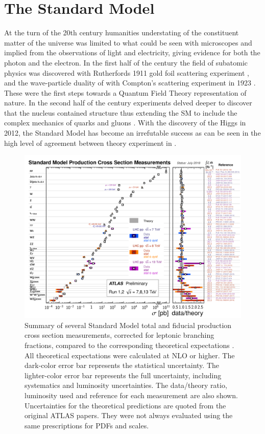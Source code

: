 \section{The Standard Model} \label{sec:theory:standardmodel}

At the turn of the 20th century humanities understating of the constituent
matter of the universe was limited to what could be seen with microscopes and
implied from the observations of light and electricity, giving evidence for
both the photon and the electron.  In the first half of the century the field
of subatomic physics was discovered with Rutherfords 1911 gold foil scattering
experiment \cite{Rutherford:1911zz}, and the wave-particle duality of with
Compton's scattering experiment in 1923 \cite{PhysRev.21.483}. These were the
first steps towards a Quantum Field Theory representation of nature.  In the
second half of the century experiments delved deeper to discover that the
nucleus contained structure thus extending the SM to include the complex
mechanics of quarks and gluons \cite{Fritzsch:1972jv}.  With the discovery of
the Higgs in 2012, the Standard Model has become an irrefutable success as can
be seen in the high level of agreement between theory experiment in
.

\begin{figure}[!htbp]
  \begin{center}
    \includegraphics[width=\linewidth]{figures/theory/xsection_measurements.pdf}
\caption{ Summary of several Standard Model total and fiducial production cross
section measurements, corrected for leptonic branching fractions, compared to
the corresponding theoretical expectations \cite{StandardModelPublicResults}.
All theoretical expectations were calculated at NLO or higher. The dark-color
error bar represents the statistical uncertainty. The lighter-color error bar
represents the full uncertainty, including systematics and luminosity
uncertainties. The data/theory ratio, luminosity used and reference for each
measurement are also shown. Uncertainties for the theoretical predictions are
quoted from the original ATLAS papers. They were not always evaluated using the
same prescriptions for PDFs and scales.}
    \label{fig:xsection_measurements}
  \end{center}
\end{figure}

